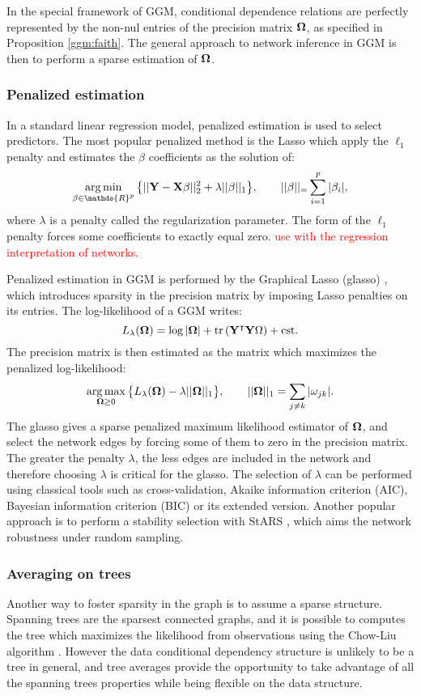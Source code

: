 In the special framework of GGM, conditional dependence relations are perfectly represented by the non-nul entries of the precision matrix ${\boldsymbol{\Omega}}$, as specified in Proposition \ref{ggm:faith}. The general approach to network inference in GGM is then to perform a sparse estimation of ${\boldsymbol{\Omega}}$.

 \subsubsection{Penalized estimation}
 In a standard linear regression model, penalized estimation is used to select predictors. The most popular penalized method is the Lasso \citep{lasso} which apply the $\ell_1$ penalty and estimates the $\beta$ coefficients as the solution of:
 $$\argmin_{\beta \in \mathds{R}^p} \big\{ ||\Yb - \Xb\beta ||^2_2 + \lambda ||\beta||_1\big\}, \qquad ||\beta||_=\sum_{i=1}^p |\beta_i|,$$
 where $\lambda$ is a penalty called the regularization parameter.  The form of the $\ell_1$ penalty forces some coefficients to exactly equal zero.
 \textcolor{red}{use with the regression interpretation of networks}.
 
 Penalized estimation in GGM is performed by the Graphical Lasso (glasso) \citep{glasso}, which introduces sparsity in the precision matrix by imposing Lasso penalties on its entries. The log-likelihood of a GGM writes:
 $$L_\lambda({\boldsymbol{\Omega}}) = \log |{\boldsymbol{\Omega}}| +\rm tr\left( {\bf Y}^\intercal {\bf Y} {\boldsymbol{\Omega}} \right)+cst .$$
 The precision matrix is then estimated as the matrix which maximizes the penalized log-likelihood:
 $$\operatorname*{arg\,max}_{{\boldsymbol{\Omega}}\geq 0} \big\{L_\lambda({\boldsymbol{\Omega}}) - \lambda ||{\boldsymbol{\Omega}}||_1\big\}, \qquad ||{\boldsymbol{\Omega}}||_1 = \sum_{j\neq k} |\omega_{jk}|.$$
The glasso gives a sparse penalized maximum likelihood estimator of ${\boldsymbol{\Omega}}$, and select the network edges by forcing some of them to zero in the precision matrix. The greater the penalty $\lambda$, the less edges are included in the network and therefore choosing $\lambda$ is critical for the glasso. The selection of $\lambda$ can be performed using classical tools such as cross-validation, Akaike information criterion (AIC),  Bayesian information criterion (BIC) or its extended version.  Another popular approach is to perform a stability selection with StARS \citep{stars}, which aims the network robustness under random sampling.


 
 \subsubsection{Averaging on trees}
  Another way to foster sparsity in the graph is to assume a sparse structure. Spanning trees are the sparsest connected graphs, and it is possible to computes the tree which maximizes the likelihood from observations using  the Chow-Liu algorithm \citep{ChowLiu}. However the data conditional dependency structure is unlikely to be a tree in general, and tree averages provide the opportunity to take advantage of all the spanning trees properties while being flexible on the data structure. \\

